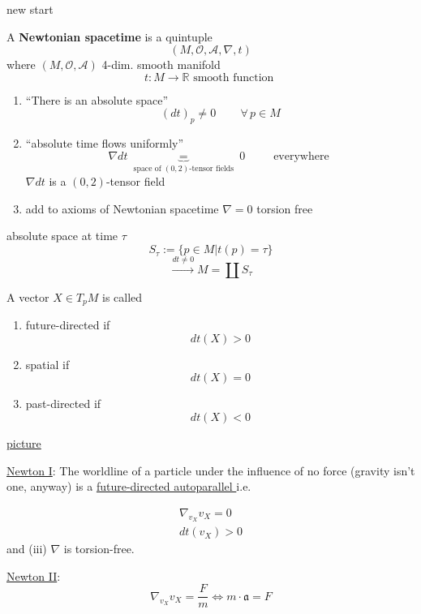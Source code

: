 	new start
	\begin{definition}
		A \textbf{Newtonian spacetime} is a quintuple \[
		(M , \mathcal{O}, \mathcal{A}, \nabla , t)
		\]
		where $(M,\mathcal{O}, \mathcal{A})$ 4-dim. smooth manifold
		\[
		t: M \to \mathbb{R} \text{ smooth function }
		\]
		
		\begin{enumerate}
			\item[(i)] ``There is an absolute space''
			\[
			(dt)_p \neq 0 \quad \quad \, \forall \, p \in M 
			\]
			\item[(ii)] ``absolute time flows uniformly''
			\[
			\nabla dt \underbrace{=}_{ \text{ space of $(0,2)$-tensor fields } }  0 \quad \quad \, \text{ everywhere }
			\]
			$\nabla dt $ is a $(0,2)$-tensor field
			\item[(iii)] add to axioms of Newtonian spacetime 
			$\nabla = 0$ torsion free
		\end{enumerate}
	\end{definition}
	
	\begin{definition}
		absolute space at time $\tau$ 
		\[
		S_{\tau} := \lbrace p\in M | t(p) = \tau \rbrace
		\]
		\[
		\xrightarrow{ dt \neq 0 } M = \coprod S_{\tau}
		\]
	\end{definition}
	
	\begin{definition} A vector $X \in T_p M$ is called 
		\begin{enumerate}
			\item[(a)] future-directed if 
			\[
			dt(X) > 0 
			\]
			\item[(b)] spatial if 
			\[
			dt(X) = 0 
			\]
			\item[(c)]
			past-directed if 
			\[
			dt(X) < 0
			\]
		\end{enumerate}
	\end{definition}
	
	\underline{picture}
	
	\underline{Newton I}: The worldline of a particle under the influence of no force (gravity isn't one, anyway) is a \underline{future-directed autoparallel } i.e.
	
	\[
	\begin{gathered}
	\nabla_{v_{X}} v_{X} = 0 \\
	dt(v_{X}) > 0 
	\end{gathered}
	\]
	and
	(iii) $\nabla$ is torsion-free.
	
	\underline{Newton II}: 
	\[
	\nabla_{v_{X}} v_X = \frac{F}{m} \Longleftrightarrow m \cdot \mathfrak{a} = F
	\]
	
